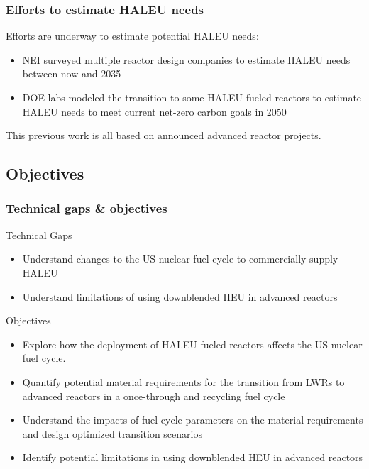 \begin{frame}
    \frametitle{Efforts to estimate HALEU needs}
    Efforts are underway to estimate potential \gls{HALEU} needs:
    \begin{itemize}
        \item \gls{NEI} surveyed multiple reactor design companies
              to estimate \gls{HALEU} needs between now and 2035 
              \cite{korsnick_updated_2021,nuclear_energy_institute_establishing_2022}
        \item \gls{DOE} labs modeled the transition to some 
              \gls{HALEU}-fueled reactors to estimate \gls{HALEU} needs 
              to meet current net-zero carbon goals in 2050 \cite{dixon_estimated_2022}
    \end{itemize}
    This previous work is all based on announced advanced reactor projects.
\end{frame}

\subsection{Objectives}
\begin{frame}
    \frametitle{Technical gaps \& objectives}
    \begin{block}{Technical Gaps}
        \begin{itemize}
            \item Understand changes to the US nuclear fuel cycle to 
                  commercially supply \gls{HALEU}
            \item Understand limitations of using downblended \gls{HEU} 
                  in advanced reactors         
        \end{itemize}
    \end{block}
    \pause
    \begin{block}{Objectives}
        \begin{itemize}
        \item<2-> Explore how the deployment of \gls{HALEU}-fueled reactors 
        affects the US nuclear fuel cycle. 
        \item<2-> Quantify potential material requirements for the transition from 
              \glspl{LWR} to advanced reactors in a once-through and recycling 
              fuel cycle
        \item<2-> Understand the impacts of fuel cycle parameters on the 
              material requirements and design optimized transition scenarios
        \item<2-> Identify potential limitations in using downblended \gls{HEU} 
              in advanced reactors
        \end{itemize}
    \end{block}
\end{frame}